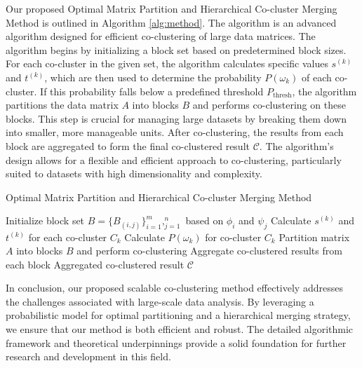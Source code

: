\documentclass[journal]{IEEEtran}
\begin{document}
Our proposed Optimal Matrix Partition and Hierarchical Co-cluster Merging Method is outlined in Algorithm \ref{alg:method}. The algorithm is an advanced algorithm designed for efficient co-clustering of large data matrices. The algorithm begins by initializing a block set based on predetermined block sizes. For each co-cluster in the given set, the algorithm calculates specific values $s^{(k)}$ and $t^{(k)}$, which are then used to determine the probability $P(\omega_k)$ of each co-cluster. If this probability falls below a predefined threshold $P_{\text{thresh}}$, the algorithm partitions the data matrix $A$ into blocks $B$ and performs co-clustering on these blocks. This step is crucial for managing large datasets by breaking them down into smaller, more manageable units. After co-clustering, the results from each block are aggregated to form the final co-clustered result $\mathcal{C}$. The algorithm's design allows for a flexible and efficient approach to co-clustering, particularly suited to datasets with high dimensionality and complexity.

\begin{algorithm}[!t]
  \caption{Optimal Matrix Partition and Hierarchical Co-cluster Merging Method}\label{alg:method}
  \begin{algorithmic}[1]
    \STATE Initialize block set $B = \{B_{(i,j)}\}_{i=1}^m,_{j=1}^n$ based on $\phi_i$ and $\psi_j$
    \STATE Calculate $s^{(k)}$ and $t^{(k)}$ for each co-cluster $C_k$
    \STATE Calculate $P(\omega_k)$ for co-cluster $C_k$
    \STATE Partition matrix $A$ into blocks $B$ and perform co-clustering
    \STATE Aggregate co-clustered results from each block
    \ENDIF
    \ENDFOR
    \RETURN Aggregated co-clustered result $\mathcal{C}$
  \end{algorithmic}
\end{algorithm}

In conclusion, our proposed scalable co-clustering method effectively addresses the challenges associated with large-scale data analysis. By leveraging a probabilistic model for optimal partitioning and a hierarchical merging strategy, we ensure that our method is both efficient and robust. The detailed algorithmic framework and theoretical underpinnings provide a solid foundation for further research and development in this field.
\end{document}
